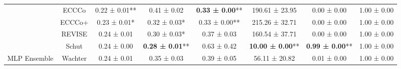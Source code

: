 \begin{table}
{\begin{tabular}[t]{cccccccc}
 & ECCCo & 0.22 ± 0.01** & 0.41 ± 0.02\hphantom{*}\hphantom{*} & \textbf{0.33 ± 0.00}** & 190.61 ± 23.95\hphantom{*}\hphantom{*} & 0.00 ± 0.00\hphantom{*}\hphantom{*} & 1.00 ± 0.00\hphantom{*}\hphantom{*}\\

 & ECCCo+ & 0.23 ± 0.01*\hphantom{*} & 0.32 ± 0.03*\hphantom{*} & 0.33 ± 0.00** & 215.26 ± 32.71\hphantom{*}\hphantom{*} & 0.00 ± 0.00\hphantom{*}\hphantom{*} & 1.00 ± 0.00\hphantom{*}\hphantom{*}\\

 & REVISE & 0.24 ± 0.01\hphantom{*}\hphantom{*} & 0.30 ± 0.03*\hphantom{*} & 0.37 ± 0.03\hphantom{*}\hphantom{*} & 160.54 ± 37.71\hphantom{*}\hphantom{*} & 0.00 ± 0.00\hphantom{*}\hphantom{*} & 1.00 ± 0.00\hphantom{*}\hphantom{*}\\

 & Schut & 0.24 ± 0.00\hphantom{*}\hphantom{*} & \textbf{0.28 ± 0.01}** & 0.63 ± 0.42\hphantom{*}\hphantom{*} & \textbf{10.00 ± 0.00}** & \textbf{0.99 ± 0.00}** & 1.00 ± 0.00\hphantom{*}\hphantom{*}\\

\multirow[t]{-6}{*}{\centering\arraybackslash MLP Ensemble} & Wachter & 0.24 ± 0.01\hphantom{*}\hphantom{*} & 0.35 ± 0.03\hphantom{*}\hphantom{*} & 0.39 ± 0.05\hphantom{*}\hphantom{*} & 56.11 ± 20.82\hphantom{*}\hphantom{*} & 0.01 ± 0.00\hphantom{*}\hphantom{*} & 1.00 ± 0.00\hphantom{*}\hphantom{*}\\
\bottomrule
\end{tabular}}
\end{table}
